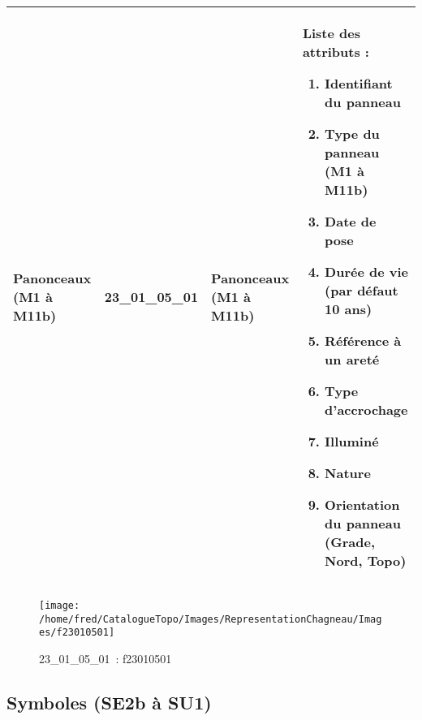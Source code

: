 \documentclass[12pt,titlepage]{book}
\begin{document}
\renewcommand{\arraystretch}{1.2}
\begin{supertabular}{|p{10cm}|c|p{13cm}|p{12cm}|}
 Panonceaux (M1 à M11b) & 23\_01\_05\_01 & Panonceaux (M1 à M11b) & Liste des attributs :
\begin{enumerate}
  \item Identifiant du panneau  \item Type du panneau (M1 à M11b)  \item Date de pose  \item Durée de vie (par défaut 10 ans)  \item Référence à un areté  \item Type d'accrochage  \item Illuminé  \item Nature  \item Orientation du panneau (Grade, Nord, Topo)\end{enumerate}
\\
\hline
\end{supertabular}
\begin{figure}[h!]
  \hfill         %
  \begin{minipage}[t]{3cm}
    \begin{center}
      \texttt{[image: /home/fred/CatalogueTopo/Images/RepresentationChagneau/Images/f23010501]}
      \caption[~23\_01\_05\_01]{\small{23\_01\_05\_01~:} \tiny{f23010501}}\label{f23010501}
    \end{center}
  \end{minipage}
\end{figure}


\subsection{Symboles (SE2b à SU1)}
\noindent
\vspace{\baselineskip}
\end{document}
